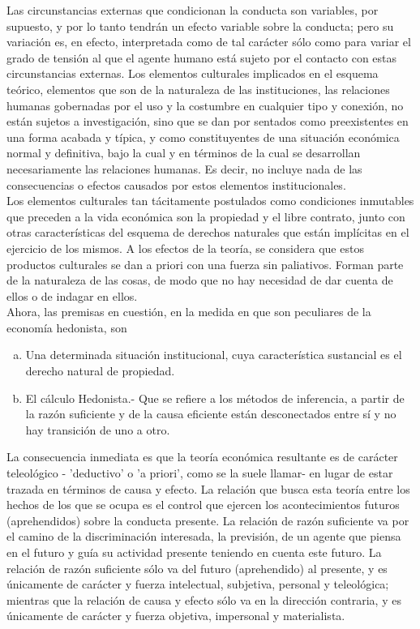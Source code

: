 Las circunstancias externas que condicionan la conducta son variables, por supuesto, y por lo tanto tendrán un efecto variable sobre la conducta; pero su variación es, en efecto, interpretada como de tal carácter sólo como para variar el grado de tensión al que el agente humano está sujeto por el contacto con estas circunstancias externas. Los elementos culturales implicados en el esquema teórico, elementos que son de la naturaleza de las instituciones, las relaciones humanas gobernadas por el uso y la costumbre en cualquier tipo y conexión, no están sujetos a investigación, sino que se dan por sentados como preexistentes en una forma acabada y típica, y como constituyentes de una situación económica normal y definitiva, bajo la cual y en términos de la cual se desarrollan necesariamente las relaciones humanas. Es decir, no incluye nada de las consecuencias o efectos causados por estos elementos institucionales.\\
Los elementos culturales tan tácitamente postulados como condiciones inmutables que preceden a la vida económica son la propiedad y el libre contrato, junto con otras características del esquema de derechos naturales que están implícitas en el ejercicio de los mismos. A los efectos de la teoría, se considera que estos productos culturales se dan a priori con una fuerza sin paliativos. Forman parte de la naturaleza de las cosas, de modo que no hay necesidad de dar cuenta de ellos o de indagar en ellos.\\

Ahora, las premisas en cuestión, en la medida en que son peculiares de la economía hedonista, son
\begin{enumerate}[(a)]
    \item Una determinada situación institucional, cuya característica sustancial es el derecho natural de propiedad.
    \item El cálculo Hedonista.- Que se refiere a los métodos de inferencia, a partir de la razón suficiente y de la causa eficiente están desconectados entre sí y no hay transición de uno a otro.
\end{enumerate}

La consecuencia inmediata es que la teoría económica resultante es de carácter teleológico - 'deductivo' o 'a priori', como se la suele llamar- en lugar de estar trazada en términos de causa y efecto. La relación que busca esta teoría entre los hechos de los que se ocupa es el control que ejercen los acontecimientos futuros (aprehendidos) sobre la conducta presente. La relación de razón suficiente va por el camino de la discriminación interesada, la previsión, de un agente que piensa en el futuro y guía su actividad presente teniendo en cuenta este futuro. La relación de razón suficiente sólo va del futuro (aprehendido) al presente, y es únicamente de carácter y fuerza intelectual, subjetiva, personal y teleológica; mientras que la relación de causa y efecto sólo va en la dirección contraria, y es únicamente de carácter y fuerza objetiva, impersonal y materialista.\\

